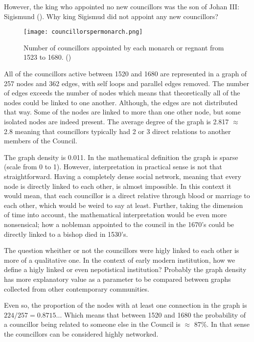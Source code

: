 However, the king who appointed no new councillors was the son of Johan III: Sigismund (). 
Why king Sigismud did not appoint any new councillors? 

\begin{figure}
	\texttt{[image: councillorspermonarch.png]}
	\centering
	\caption[Number of councillors appointed by each ruler between 1523-1680] {Number of councillors appointed by each monarch or regnant from 1523 to 1680. (\cite{councillorsDS})} 
	\centering
\end{figure}

All of the councillors active between 1520 and 1680 are represented in a graph of 257 nodes and 362 edges, with self loops and parallel edges removed. The number of edges exceeds the number of nodes which means that theoretically all of the nodes could be linked to one another. Although, the edges are not distributed that way. Some of the nodes are linked to more than one other node, but some isolated nodes are indeed present. The average degree of the graph is 2.817 $\approx$ 2.8 meaning that councillors typically had 2 or 3 direct relations to another members of the Council.

The graph density is 0.011. In the mathematical definition the graph is sparse (scale from 0 to 1). However, interpretation in practical sense is not that straightforward. Having a completely dense social network, meaning that every node is directly linked to each other, is almost impossible. In this context it would mean, that each councillor is a direct relative through blood or marriage to each other, which would be weird to say at least. Further, taking the dimension of time into account, the mathematical interpretation would be even more nonsensical; how a nobleman appointed to the council in the 1670's could be directly linked to a bishop died in 1530's. 

The question wheither or not the councillors were higly linked to each other is more of a qualitative one. In the context of early modern institution, how we define a higly linked or even nepotistical institution? Probably the graph density has more explanatory value as a parameter to be compared between graphs collected from other contemporary communities.

Even so, the proportion of the nodes with at least one connection in the graph is $224/257=0.8715...$ Which means that between 1520 and 1680 the probability of a councillor being related to someone else in the Council is $\approx$ 87\%. In that sense the councillors can be considered highly networked.


